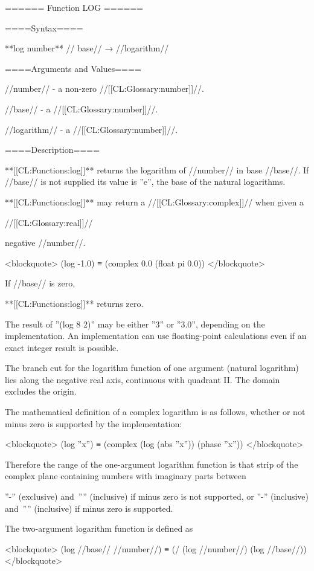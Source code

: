 ====== Function LOG ======

====Syntax====

**log {number** //\opt} base// → //logarithm//

====Arguments and Values====

//number// - a non-zero //[[CL:Glossary:number]]//.

//base// - a //[[CL:Glossary:number]]//.

//logarithm// - a //[[CL:Glossary:number]]//.

====Description====

**[[CL:Functions:log]]** returns the logarithm of //number// in base //base//. If //base// is not supplied its value is ''e'', the base of the natural logarithms.

**[[CL:Functions:log]]** may return a //[[CL:Glossary:complex]]// when given a

//[[CL:Glossary:real]]//

negative //number//.

<blockquote> (log -1.0) ≡ (complex 0.0 (float pi 0.0)) </blockquote>

If //base// is zero,

**[[CL:Functions:log]]** returns zero.

The result of ''(log 8 2)'' may be either ''3'' or ''3.0'', depending on the implementation. An implementation can use floating-point calculations even if an exact integer result is possible.

The branch cut for the logarithm function of one argument (natural logarithm) lies along the negative real axis, continuous with quadrant II. The domain excludes the origin.

The mathematical definition of a complex logarithm is as follows, whether or not minus zero is supported by the implementation:

<blockquote> (log ''x'') ≡ (complex (log (abs ''x'')) (phase ''x'')) </blockquote>

Therefore the range of the one-argument logarithm function is that strip of the complex plane containing numbers with imaginary parts between

''-\pi'' (exclusive) and~''\pi'' (inclusive) if minus zero is not supported, or ''-\pi'' (inclusive) and~''\pi'' (inclusive) if minus zero is supported.

The two-argument logarithm function is defined as

<blockquote> (log //base// //number//) ≡ (/ (log //number//) (log //base//)) </blockquote>

